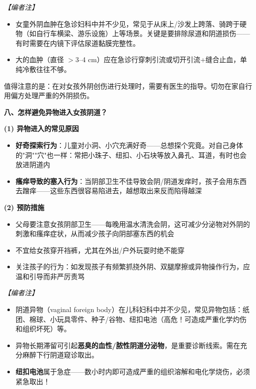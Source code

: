 \begin{enumerate}
\vspace{0.3em}
\noindent\textit{【编者注】}
\begin{itemize}
	\item 女童外阴血肿在急诊妇科中并不少见，常见于从床上/沙发上跨落、骑跨于硬物（如自行车横梁、游乐设施）上等场景。关键是要排除尿道和阴道损伤——有时需要在内镜下评估尿道黏膜完整性。
	\item 大的血肿（直径 $>$3--4 cm）应在急诊行穿刺引流或切开引流+缝合止血，单纯冷敷往往不够。
\end{itemize}

\begin{tcolorbox}[colback=pink!5!white,colframe=red!50!black,title=贴心小叮咛]
值得注意的是：在对女孩外阴创伤进行处理时，需要有医生的指导。切勿在家自行用偏方处理严重的外阴损伤。
\end{tcolorbox}

\vspace{0.8em}
\noindent\textbf{八、怎样避免异物进入女孩阴道？}

\vspace{0.5em}
\noindent\textbf{(1) 异物进入的常见原因}

\begin{itemize}
	\item \textbf{好奇探索行为}：儿童对小洞、小穴充满好奇——总想探个究竟。对自己身体的"洞""穴"也一样：常把小珠子、纽扣、小石块等放入鼻孔、耳道，有时也会放进阴道内
	\item \textbf{瘙痒导致的塞入行为}：当阴部卫生不佳导致会阴/阴道发痒时，孩子会用东西去蹭痒——这些东西很容易陷进去，越想取出来反而陷得越深
\end{itemize}

\vspace{0.3em}
\noindent\textbf{(2) 预防措施}

\begin{itemize}
	\item 父母要注意女孩阴部卫生——每晚用温水清洗会阴，这可减少分泌物对外阴的刺激和瘙痒症状，从而减少孩子向阴部塞东西的机会
	\item 不宜给女孩穿开裆裤，尤其在外出/户外玩耍时绝不能穿
	\item 关注孩子的行为：如发现孩子有频繁抓挠外阴、双腿摩擦或异物操作行为，应温和引导而非严厉责骂
\end{itemize}

\vspace{0.3em}
\noindent\textit{【编者注】}
\begin{itemize}
	\item 阴道异物（vaginal foreign body）在儿科妇科中并不少见，常见异物包括：纸团、棉球、小玩具零件、种子/谷物、纽扣电池（高危！可造成严重化学灼伤和组织坏死）等。
	\item 异物长期滞留可引起\textbf{恶臭的血性/脓性阴道分泌物}，是重要诊断线索。需在充分麻醉下行阴道窥诊取出。
	\item \textbf{纽扣电池}属于急症——数小时内即可造成严重的组织溶解和电化学烧伤，必须紧急取出！
\end{itemize}


\end{enumerate}
